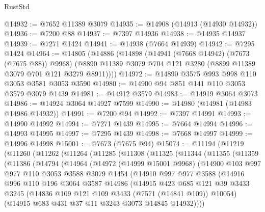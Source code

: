\begin{lexlean}{RustStd}
\begin{coremodule}
@14932 := @7652 @11389 @3079
@14935 := @14908 (@14913 (@14930 @14932))
@14936 := @7200 @88
@14937 := @7397 @14936
@14938 := @14935 @14937
@14939 := @7271 @1424
@14941 := @14938 (@7664 @14939)
@14942 := @7295 @1424
@14964 := @14805
    (@14886
      (@14898
        (@14941 (@7668 @14942) (@7673 (@7675 @88)) @9968)
        (@8890 @11389 @3079 @704 @121 @3280 (@8899 @11389 @3079 @701 @121 @3279 @8911))))
@14972 := @14890 @3575 @993 @998 @110 @3053 @3581 @3053 @3590
@14980 := @14900 @94 @851 @141 @110 @3053 @3579 @3079 @1439
@14981 := @14912 @3579
@14983 := @14919 @3064 @3073
@14986 := @14924 @3064 @14927 @7599
@14990 := @14980 (@14981 (@14983 @14986 @14932))
@14991 := @7200 @94
@14992 := @7397 @14991
@14993 := @14990 @14992
@14994 := @7271 @1439
@14995 := @7664 @14994
@14996 := @14993 @14995
@14997 := @7295 @1439
@14998 := @7668 @14997
@14999 := @14996 @14998
@15001 := @7673 (@7675 @94)
@15074 := @11194
    (@11219
      (@11260
        (@11262
          (@11264
            (@11285
              (@11308
                (@11325
                  (@11344
                    (@11355
                      (@11359
                        (@11386
                          (@14794
                            (@14964
                              (@14972
                                (@14999 @15001 @9968)
                                (@14900
                                  @103
                                  @997
                                  @977
                                  @110
                                  @3053
                                  @3588
                                  @3079
                                  @1454
                                  (@14910
                                    @997
                                    @977
                                    @3588
                                    (@14916
                                      @996
                                      @110
                                      @196
                                      @3064
                                      @3587
                                      @14986
                                      (@14915
                                        @423
                                        @685
                                        @121
                                        @39
                                        @3433
                                        @3245
                                        (@14836 @109 @121 @109 @3433 (@7571 (@14841 @109)) @10054)
                                        (@14915 @683 @431 @37 @11 @3243 @3073 @14845 @14932))))

\end{coremodule}
\end{lexlean}
